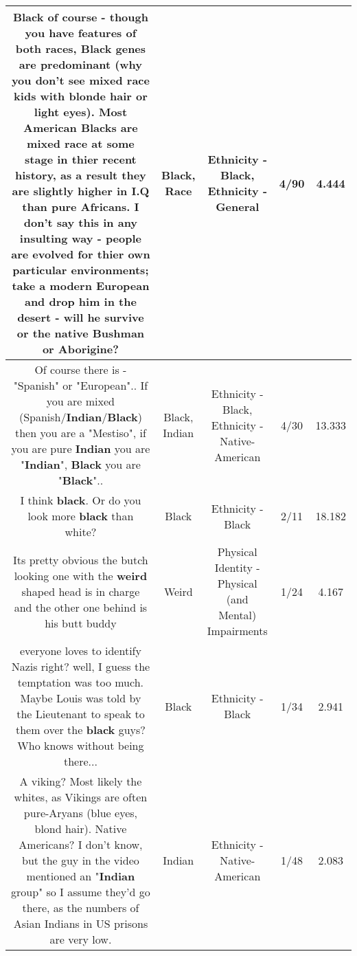 \documentclass[11pt]{article}
\newlength\mylength
\begin{document}
\begin{center}
\begin{longtable}{|C{.65\mylength}|C{.30\mylength}|C{.12\mylength}|C{.12\mylength}|C{.12\mylength}|}
  \small Black of course - though you have features of both races, \textbf{Black} genes are predominant (why you don't see mixed \textbf{race} kids with blonde hair or light eyes). Most American Blacks are mixed \textbf{race} at some stage in thier recent history, as a result they are slightly higher in I.Q than pure Africans. I don't say this in any insulting way - people are evolved for thier own particular environments; take a modern European and drop him in the desert - will he survive or the native Bushman or Aborigine?\normalsize   & Black, Race & Ethnicity - Black, Ethnicity - General & 4/90 & 4.444 \\  \hline
  \small Of course there is - "Spanish" or "European"..  If you are mixed (Spanish/\textbf{Indian}/\textbf{Black}) then you are a "Mestiso", if you are pure \textbf{Indian} you are "\textbf{Indian}", \textbf{Black} you are "\textbf{Black}"..\normalsize   & Black, Indian & Ethnicity - Black, Ethnicity - Native-American & 4/30 & 13.333 \\  \hline
  \small I think \textbf{black}. Or do you look more \textbf{black} than white?\normalsize   & Black & Ethnicity - Black & 2/11 & 18.182 \\  \hline
  \small Its pretty obvious the butch looking one with the \textbf{weird} shaped head is in charge and the other one behind is his butt buddy\normalsize   & Weird & Physical Identity - Physical (and Mental) Impairments & 1/24 & 4.167 \\  \hline
  \small everyone loves to identify Nazis right? well, I guess the temptation was too much. Maybe Louis was told by the Lieutenant to speak to them over the \textbf{black} guys? Who knows without being there...\normalsize   & Black & Ethnicity - Black & 1/34 & 2.941 \\  \hline
  \small A viking? Most likely the whites, as Vikings are often pure-Aryans (blue eyes, blond hair). Native Americans? I don't know, but the guy in the video mentioned an "\textbf{Indian} group" so I assume they'd go there, as the numbers of Asian Indians in US prisons are very low.\normalsize   & Indian & Ethnicity - Native-American & 1/48 & 2.083 \\  \hline

\end{longtable}
\end{center}
\end{document}
